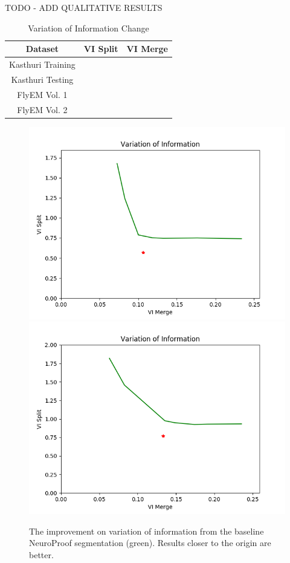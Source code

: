 TODO - ADD QUALITATIVE RESULTS

\begin{table}
	\centering
	\begin{tabular}{c c c} \hline
		\textbf{Dataset} & \textbf{VI Split} & \textbf{VI Merge} \\ \hline
		Kasthuri Training &  & \\
		Kasthuri Testing & & \\
		FlyEM Vol. 1 & & \\
		FlyEM Vol. 2 & & \\ \hline
	\end{tabular}
	\caption{Variation of Information Change}
	\label{table:variation-of-information}
\end{table}


\begin{figure}[t!]
	\centering
	\includegraphics[width=0.42\linewidth]{./figures/variation_of_information-train.png}
	\hspace{0.085\linewidth}
	\includegraphics[width=0.42\linewidth]{./figures/variation_of_information-test.png}
	\caption{The improvement on variation of information from the baseline NeuroProof segmentation (green). Results closer to the origin are better.}
	\label{fig:variation-of-information}
\end{figure}